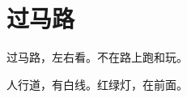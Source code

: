 \documentclass[12pt,UTF-8,openany]{ctexbook}
\begin{document}
\hanzibox{}\hanzibox{}\hanzibox{}\hanzibox{}\hspace{1em}\hanzibox{}\hanzibox{}\hanzibox{}\hanzibox{}

\hanzibox{}\hanzibox{}\hanzibox{}\hanzibox{}\hspace{1em}\hanzibox{}\hanzibox{}\hanzibox{}\hanzibox{}

\hanzibox{}\hanzibox{}\hanzibox{}\hanzibox{}\hspace{1em}\hanzibox{}\hanzibox{}\hanzibox{}\hanzibox{}

\hanzibox{}\hanzibox{}\hanzibox{}\hanzibox{}\hspace{1em}\hanzibox{}\hanzibox{}\hanzibox{}\hanzibox{}






\chapter{过马路}

\begin{large}
    
    过马路，左右看。不在路上跑和玩。
    
    人行道，有白线。红绿灯，在前面。
    
\end{large}


\clearpage

\begin{center}
    
\end{center}


\hanzibox{}\hanzibox{}\hanzibox{}\hanzibox{}\hspace{1em}\hanzibox{}\hanzibox{}\hanzibox{}\hanzibox{}

\hanzibox{}\hanzibox{}\hanzibox{}\hanzibox{}\hspace{1em}\hanzibox{}\hanzibox{}\hanzibox{}\hanzibox{}

\hanzibox{}\hanzibox{}\hanzibox{}\hanzibox{}\hspace{1em}\hanzibox{}\hanzibox{}\hanzibox{}\hanzibox{}

\hanzibox{}\hanzibox{}\hanzibox{}\hanzibox{}\hspace{1em}
\end{document}
